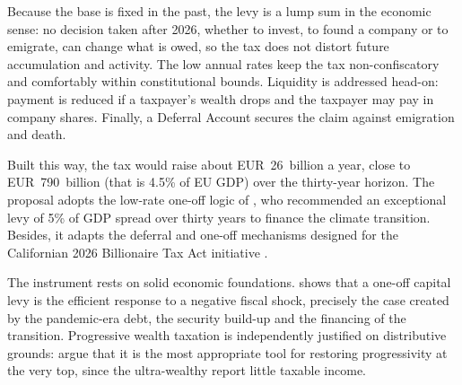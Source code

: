\documentclass[../../main]{subfiles}
\begin{document}
Because the base is fixed in the past, the levy is a lump sum in the economic sense: no decision taken after 2026, whether to invest, to found a company or to emigrate, can change what is owed, so the tax does not distort future accumulation and activity. The low annual rates keep the tax non-confiscatory and comfortably within constitutional bounds. Liquidity is addressed head-on: payment is reduced if a taxpayer's wealth drops and the taxpayer may pay in company shares. Finally, a Deferral Account secures the claim against emigration and death. 

Built this way, the tax would raise %
about 
EUR~26~billion a year, close to EUR~790~billion (that is 4.5\% of EU GDP) over the thirty-year horizon. %
The proposal adopts the low-rate one-off logic of \citet{PisaniFerryMahfouz2023}, who recommended an exceptional levy of 5\% of GDP spread over thirty years to finance the climate transition. 
Besides, it %
adapts the deferral and one-off mechanisms designed for the Californian 2026 Billionaire Tax Act initiative \citep{CABillionaireTax2026}. %

The instrument rests on solid economic foundations. \citet{Farhi2010} shows that a one-off capital levy is
the efficient response to a negative fiscal shock, %
precisely the case created by 
the pandemic-era debt, the security build-up and the financing of the transition. Progressive wealth taxation is independently justified on distributive grounds: \citet{SaezZucman2019} argue that %
it is the most appropriate tool for restoring progressivity at the very top, since the ultra-wealthy report little taxable income.

\end{document}
